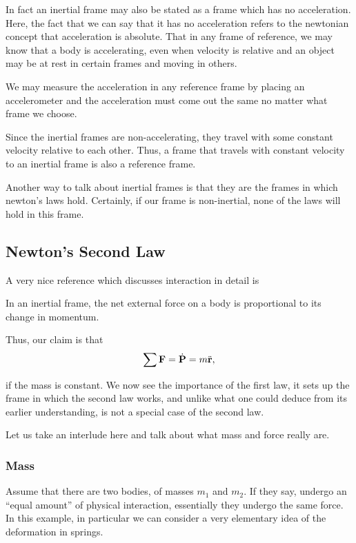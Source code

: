 In fact an inertial frame may also be stated as a frame which has no acceleration.
Here, the fact that we can say that it has no acceleration refers
to the newtonian concept that acceleration is absolute. That in any frame 
of reference, we may know that a body is accelerating, even when velocity is 
relative and an object may be at rest in certain frames and moving in others.

We may measure the acceleration in any reference frame by placing 
an accelerometer and the acceleration must come out the same no matter
what frame we choose.

Since the inertial frames are non-accelerating, they travel with some constant velocity 
relative to each other. Thus, a frame that travels with constant velocity 
to an inertial frame is also a reference frame.

Another way to talk about inertial frames is that they are the frames in which newton's laws
hold. Certainly, if our frame is non-inertial, none of the laws will hold in this frame.

\subsection{Newton's Second Law}
\label{sec: newton's second law}
A very nice reference which discusses interaction in detail is \cite{kleppner}

\begin{axioms}
     In an inertial frame, the net external force on a body is proportional to its change in 
    momentum.
\end{axioms}

Thus, our claim is that
\[\sum \boldsymbol{\mathbf{F}} = \dot{\boldsymbol{\mathbf{P}}} = m\ddot{\boldsymbol{\mathbf{r}}},\]

if the mass is constant. We now see the importance of the first law, it sets up the 
frame in which the second law works, and unlike what one could 
deduce from its earlier understanding, is not 
a special case of the second law.

Let us take an interlude here and talk about what mass and force really are.

\subsubsection{Mass}

Assume that there are two bodies, of masses \(m_1\) and \(m_2\).
If they say, undergo an ``equal amount'' of physical interaction,
essentially they undergo the same force. In this example, in particular 
we can consider a very elementary idea of the deformation in springs.

